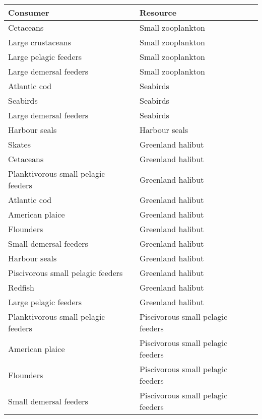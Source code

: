 \documentclass[letterpaper]{article}
\begin{document}
\begin{table}[h!]
  \centering
  \begin{tabular}{|l|l|}
      \hline
      Consumer               & Resource \\
      \hline    \hline
      Cetaceans                           & Small zooplankton \\
      Large crustaceans                   & Small zooplankton \\
      Large pelagic feeders               & Small zooplankton \\
      Large demersal feeders              & Small zooplankton \\
      Atlantic cod                        & Seabirds  \\
      Seabirds                            & Seabirds  \\
      Large demersal feeders              & Seabirds  \\
      Harbour seals                       & Harbour seals \\
      Skates                              & Greenland halibut \\
      Cetaceans                           & Greenland halibut \\
      Planktivorous small pelagic feeders & Greenland halibut \\
      Atlantic cod                        & Greenland halibut \\
      American plaice                     & Greenland halibut \\
      Flounders                           & Greenland halibut \\
      Small demersal feeders              & Greenland halibut \\
      Harbour seals                       & Greenland halibut \\
      Piscivorous small pelagic feeders   & Greenland halibut \\
      Redfish                             & Greenland halibut \\
      Large pelagic feeders               & Greenland halibut \\
      Planktivorous small pelagic feeders & Piscivorous small pelagic feeders \\
      American plaice                     & Piscivorous small pelagic feeders \\
      Flounders                           & Piscivorous small pelagic feeders \\
      Small demersal feeders              & Piscivorous small pelagic feeders \\

\end{tabular}
\end{table}
\end{document}
